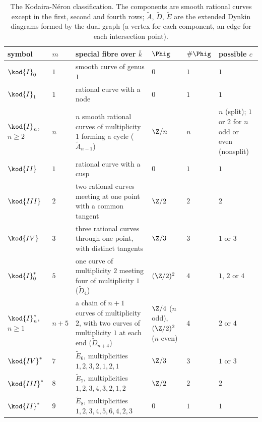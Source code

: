 \begin{table}[ht]
\centering\footnotesize\setlength{\tabcolsep}{4pt}
\begin{tabular}{p{1.5cm}lp{4.6cm}p{1.6cm}lp{2.3cm}}
\toprule
symbol & $m$ & special fibre over $\bar k$ & $\Phig$ & $\#\Phig$ & possible $c$\\
\midrule
$\kod{I}_0$ & $1$ & smooth curve of genus $1$ & $0$ & $1$ & $1$\\
$\kod{I}_1$ & $1$ & rational curve with a node & $0$ & $1$ & $1$\\
$\kod{I}_n$, $n\ge2$ & $n$ & $n$ smooth rational curves of multiplicity $1$ forming a cycle ($\tilde A_{n-1}$) & $\Z/n$ & $n$ & $n$ (split); $1$ or $2$ for $n$ odd or even (nonsplit)\\
$\kod{II}$ & $1$ & rational curve with a cusp & $0$ & $1$ & $1$\\
$\kod{III}$ & $2$ & two rational curves meeting at one point with a common tangent & $\Z/2$ & $2$ & $2$\\
$\kod{IV}$ & $3$ & three rational curves through one point, with distinct tangents & $\Z/3$ & $3$ & $1$ or $3$\\
$\kod{I}_0^*$ & $5$ & one curve of multiplicity $2$ meeting four of multiplicity $1$ ($\tilde D_4$) & $(\Z/2)^2$ & $4$ & $1$, $2$ or $4$\\
$\kod{I}_n^*$, $n\ge1$ & $n+5$ & a chain of $n+1$ curves of multiplicity $2$, with two curves of multiplicity $1$ at each end ($\tilde D_{n+4}$) & $\Z/4$ ($n$ odd), $(\Z/2)^2$ ($n$ even) & $4$ & $2$ or $4$\\
$\kod{IV}^*$ & $7$ & $\tilde E_6$, multiplicities $1,2,3,2,1,2,1$ & $\Z/3$ & $3$ & $1$ or $3$\\
$\kod{III}^*$ & $8$ & $\tilde E_7$, multiplicities $1,2,3,4,3,2,1,2$ & $\Z/2$ & $2$ & $2$\\
$\kod{II}^*$ & $9$ & $\tilde E_8$, multiplicities $1,2,3,4,5,6,4,2,3$ & $0$ & $1$ & $1$\\
\bottomrule
\end{tabular}
\caption{The Kodaira-N\'eron classification. The components are smooth rational curves except in the first, second and
fourth rows; $\tilde A$, $\tilde D$, $\tilde E$ are the extended Dynkin diagrams formed by the dual graph (a vertex for each
component, an edge for each intersection point).}\label{tab:reduction:kodaira}
\end{table}

